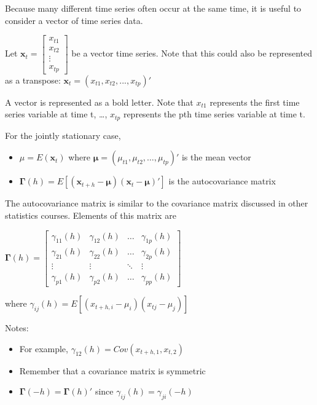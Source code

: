 \documentclass[
]{book}
\providecommand{\tightlist}{%
  \setlength{\itemsep}{0pt}\setlength{\parskip}{0pt}}
\theoremstyle{definition}
\theoremstyle{definition}
\theoremstyle{definition}
\theoremstyle{definition}
\theoremstyle{remark}
\begin{document}
Because many different time series often occur at the same time, it is useful to consider a vector of time series data.

Let \(\boldsymbol x_t=\begin{bmatrix}x_{t1}\\x_{t2}\\ \vdots \\ x_{tp} \end{bmatrix}\) be a vector time series. Note that this could also be represented as a transpose: \(\boldsymbol x_t=(x_{t1},x_{t2},...,x_{tp})'\)

A vector is represented as a bold letter. Note that \(x_{t1}\) represents the first time series variable at time t, \ldots, \(x_{tp}\) represents the pth time series variable at time t.

For the jointly stationary case,

\begin{itemize}
\tightlist
\item
  \(\mu = E(\boldsymbol x_t)\) where \(\boldsymbol \mu = (\mu_{t1}, \mu_{t2}, …, \mu_{tp})'\) is the mean vector
\item
  \(\boldsymbol \Gamma(h) = E[(\boldsymbol x_{t+h} - \boldsymbol \mu)(\boldsymbol x_t - \boldsymbol\mu)']\) is the autocovariance matrix
\end{itemize}

The autocovariance matrix is similar to the covariance matrix discussed in other statistics courses. Elements of this matrix are

\(\boldsymbol \Gamma(h)=\begin{bmatrix} \gamma_{11}(h) & \gamma_{12}(h) & \dots & \gamma_{1p}(h)\\ \gamma_{21}(h) & \gamma_{22}(h) & \dots & \gamma_{2p}(h) \\ \vdots & \vdots & \ddots & \vdots\\ \gamma_{p1}(h) & \gamma_{p2}(h) & \dots & \gamma_{pp}(h) \end{bmatrix}\)

where \(\gamma_{ij}(h)=E[(x_{t+h,i}-\mu_i)(x_{tj}-\mu_j)]\)

Notes:

\begin{itemize}
\tightlist
\item
  For example, \(\gamma_{12}(h) = Cov(x_{t+h,1}, x_{t,2})\)
\item
  Remember that a covariance matrix is symmetric
\item
  \(\boldsymbol \Gamma(-h) = \boldsymbol \Gamma(h)'\) since \(\gamma_{ij}(h) = \gamma_{ji}(-h)\)
\end{itemize}
\end{document}
